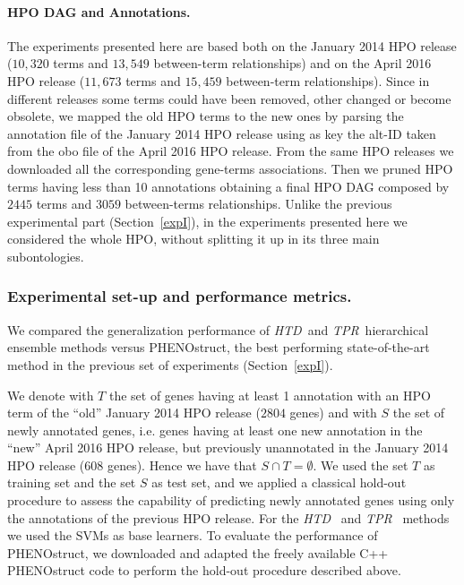 \documentclass{bioinfo}
\newcommand{\htd}{{\em HTD}}
\newcommand{\tpr}{{\em TPR}}
\begin{document}
\paragraph{HPO DAG and Annotations.} 
The experiments presented here are based both on the January 2014 HPO release ($10,320$ terms and $13,549$ between-term relationships) and on the April 2016 HPO release ($11,673$ terms and $15,459$ between-term relationships). Since in different releases some terms could have been removed, other changed or become obsolete, we mapped the old HPO terms to the new ones by parsing the annotation file of the January 2014 HPO release using as key the alt-ID taken from the obo file of the April 2016 HPO release. From the same HPO releases we downloaded all the corresponding gene-terms associations. Then we pruned HPO terms having less than 10 annotations obtaining a final HPO DAG composed by $2445$ terms and $3059$ between-terms relationships. 
Unlike the previous experimental part (Section~\ref{expI}), in the experiments presented here we considered the whole HPO, without splitting it up in its three main subontologies. 

\subsubsection{Experimental set-up and performance metrics.}
\label{setup2}
We compared the generalization performance of \htd~and \tpr~hierarchical ensemble methods versus PHENOstruct, the best performing  state-of-the-art method in the previous set of experiments (Section~\ref{expI}).

We denote with $T$ the set of genes having at least 1 annotation with an HPO term of the ``old''  January 2014 HPO release ($2804$ genes) and with  $S$ the set of newly annotated genes, i.e. genes having at least one new annotation in the ``new'' April 2016 HPO release, but previously unannotated in the January 2014 HPO release ($608$ genes). Hence we have that $S \cap T = \emptyset$. We used the set $T$ as training set and the set $S$ as test set, and we applied a classical hold-out procedure  to assess the capability of predicting newly annotated genes using only the annotations of the previous HPO release.
For the \htd~ and \tpr~ methods we  used the SVMs as base learners. To evaluate the performance of PHENOstruct, we downloaded and adapted the freely available C++ PHENOstruct code to perform the hold-out procedure described above.

\end{document}

